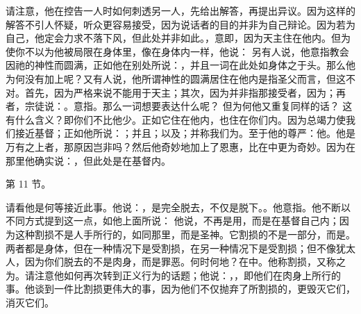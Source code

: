 请注意，他在控告一人时如何刺透另一人，先给出解答，再提出异议。因为这样的解答不引人怀疑，听众更容易接受，因为说话者的目的并非为自己辩论。因为若为自己，他定会力求不落下风，但此处并非如此。，意即，因为天主住在他内。但为使你不以为他被局限在身体里，像在身体内一样，他说： 另有人说，他意指教会因祂的神性而圆满，正如他在别处所说：，并且一词在此处如身体之于头。那么他为何没有加上呢？又有人说，他所谓神性的圆满居住在他内是指圣父而言，但这不对。首先，因为严格来说不能用于天主；其次，因为并非指那接受者，因为；再者，宗徒说：。意指。那么一词想要表达什么呢？ 但为何他又重复同样的话？ 这有什么含义？即你们不比他少。正如它住在他内，也住在你们内。因为总竭力使我们接近基督；正如他所说：；并且；以及；并称我们为。至于他的尊严：他。他是万有之上者，那原因岂非吗？然后他奇妙地加上了恩惠，比在中更为奇妙。因为在那里他确实说：，但此处是在基督内。\par

第 11 节。\par

请看他是何等接近此事。他说：，是完全脱去，不仅是脱下。。他意指。他不断以不同方式提到这一点，如他上面所说： 他说，不再是用，而是在基督自己内；因为这种割损不是人手所行的，如同那里，而是圣神。它割损的不是一部分，而是。两者都是身体，但在一种情况下是受割损，在另一种情况下是受割损；但不像犹太人，因为你们脱去的不是肉身，而是罪恶。何时何地？在中。他称割损，又称之为。请注意他如何再次转到正义行为的话题；他说：，，即他们在肉身上所行的事。他谈到一件比割损更伟大的事，因为他们不仅抛弃了所割损的，更毁灭它们，消灭它们。\par

